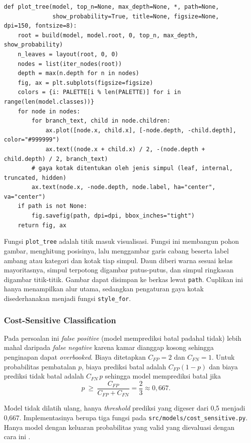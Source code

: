 \begin{lstlisting}
def plot_tree(model, top_n=None, max_depth=None, *, path=None,
              show_probability=True, title=None, figsize=None, dpi=150, fontsize=8):
    root = build(model, model.root, 0, top_n, max_depth, show_probability)
    n_leaves = layout(root, 0, 0)
    nodes = list(iter_nodes(root))
    depth = max(n.depth for n in nodes)
    fig, ax = plt.subplots(figsize=figsize)
    colors = {i: PALETTE[i % len(PALETTE)] for i in range(len(model.classes))}
    for node in nodes:
        for branch_text, child in node.children:
            ax.plot([node.x, child.x], [-node.depth, -child.depth], color="#999999")
            ax.text((node.x + child.x) / 2, -(node.depth + child.depth) / 2, branch_text)
        # gaya kotak ditentukan oleh jenis simpul (leaf, internal, truncated, hidden)
        ax.text(node.x, -node.depth, node.label, ha="center", va="center")
    if path is not None:
        fig.savefig(path, dpi=dpi, bbox_inches="tight")
    return fig, ax
\end{lstlisting}

Fungsi \texttt{plot\_tree} adalah titik masuk visualisasi. Fungsi ini membangun
pohon gambar, menghitung posisinya, lalu menggambar garis cabang beserta label
ambang atau kategori dan kotak tiap simpul. Daun diberi warna sesuai kelas
mayoritasnya, simpul terpotong digambar putus-putus, dan simpul ringkasan
digambar titik-titik. Gambar dapat disimpan ke berkas lewat \texttt{path}.
Cuplikan ini hanya menampilkan alur utama, sedangkan pengaturan gaya kotak
disederhanakan menjadi fungsi \texttt{style\_for}.

\subsubsection{Cost-Sensitive Classification}

Pada persoalan ini \textit{false positive} (model memprediksi batal padahal
tidak) lebih mahal daripada \textit{false negative} karena kamar dianggap
kosong sehingga penginapan dapat \textit{overbooked}. Biaya ditetapkan
$C_{FP}=2$ dan $C_{FN}=1$. Untuk probabilitas pembatalan $p$, biaya prediksi
batal adalah $C_{FP}(1-p)$ dan biaya prediksi tidak batal adalah $C_{FN}\,p$
sehingga model memprediksi batal jika
\[
    p\ \ge\ \frac{C_{FP}}{C_{FP}+C_{FN}}=\frac{2}{3}\approx 0{,}667.
\]

Model tidak dilatih ulang, hanya \textit{threshold} prediksi yang digeser dari
0,5 menjadi 0,667. Implementasinya berupa tiga fungsi pada
\texttt{src/models/cost\_sensitive.py}. Hanya model dengan keluaran
probabilitas yang valid yang dievaluasi dengan cara ini \cite{ref:elkan-2001}.

